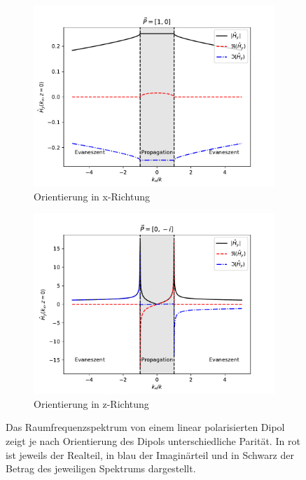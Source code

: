 \documentclass[titlepage]{article}
\begin{document}
		\begin{figure}
			\centering
			\label{fig:spatial_spectrum_zx}
			\begin{subfigure}[h]{0.49\textwidth}
				\centering
				\includegraphics[width=\textwidth]{figures/spatial_spectrum_x.pdf}
				\caption{Orientierung in x-Richtung}
				\label{fig:spatial_spectrum_x}
			\end{subfigure}		
			\begin{subfigure}[h]{0.5\textwidth}
				\centering
				\includegraphics[width=\textwidth]{figures/spatial_spectrum_z.pdf}
				\caption{Orientierung in z-Richtung}
				\label{fig:spatial_spectrum_z}
			\end{subfigure}		
			\caption{Das Raumfrequenzspektrum von  einem linear polarisierten Dipol zeigt je nach Orientierung des Dipols unterschiedliche Parität. In rot ist jeweils der Realteil, in blau der Imaginärteil und in Schwarz der Betrag des jeweiligen Spektrums dargestellt.}		
		\end{figure}
\end{document}
